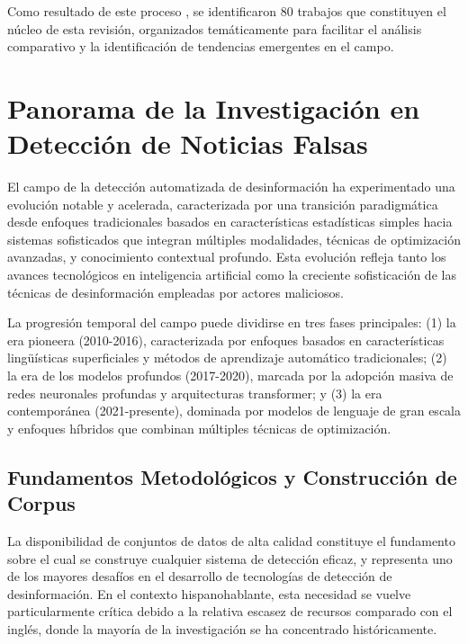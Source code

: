 Como resultado de este proceso , se identificaron 80 trabajos que constituyen el núcleo de esta revisión, organizados temáticamente para facilitar el análisis comparativo y la identificación de tendencias emergentes en el campo.

\section{Panorama de la Investigación en Detección de Noticias Falsas}
\label{sec:panorama_investigacion}

El campo de la detección automatizada de desinformación ha experimentado una evolución notable y acelerada, caracterizada por una transición paradigmática desde enfoques tradicionales basados en características estadísticas simples hacia sistemas sofisticados que integran múltiples modalidades, técnicas de optimización avanzadas, y conocimiento contextual profundo. Esta evolución refleja tanto los avances tecnológicos en inteligencia artificial como la creciente sofisticación de las técnicas de desinformación empleadas por actores maliciosos.

La progresión temporal del campo puede dividirse en tres fases principales: (1) la era pioneera (2010-2016), caracterizada por enfoques basados en características lingüísticas superficiales y métodos de aprendizaje automático tradicionales; (2) la era de los modelos profundos (2017-2020), marcada por la adopción masiva de redes neuronales profundas y arquitecturas transformer; y (3) la era contemporánea (2021-presente), dominada por modelos de lenguaje de gran escala y enfoques híbridos que combinan múltiples técnicas de optimización.

\subsection{Fundamentos Metodológicos y Construcción de Corpus}

La disponibilidad de conjuntos de datos de alta calidad constituye el fundamento sobre el cual se construye cualquier sistema de detección eficaz, y representa uno de los mayores desafíos en el desarrollo de tecnologías de detección de desinformación. En el contexto hispanohablante, esta necesidad se vuelve particularmente crítica debido a la relativa escasez de recursos comparado con el inglés, donde la mayoría de la investigación se ha concentrado históricamente.

